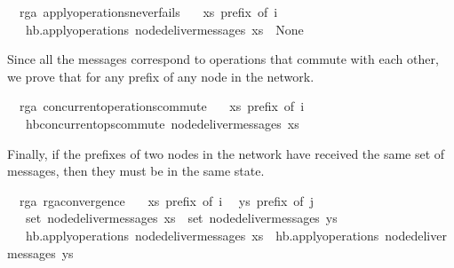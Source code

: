 \documentclass[acmlarge,review,anonymous]{acmart}\settopmatter{printfolios=true}
\begin{document}
\begin{isabellebody}
\isanewline
{}\isamarkupfalse%
\ {\isacharparenleft}\ rga{\isacharparenright}\ apply{\isacharunderscore}operations{\isacharunderscore}never{\isacharunderscore}fails{\isacharcolon}\isanewline
\ \ \ {\isachardoublequoteopen}xs\ prefix\ of\ i{\isachardoublequoteclose}\isanewline
\ \ \ {\isachardoublequoteopen}hb.apply{\isacharunderscore}operations\ {\isacharparenleft}node{\isacharunderscore}deliver{\isacharunderscore}messages\ xs{\isacharparenright}\ {\isasymnoteq}\ None{\isachardoublequoteclose}\isanewline
\end{isabellebody}

Since all the messages correspond to operations that commute with each other, we prove that  for any prefix of any node in the network.

\begin{isabellebody}
\isanewline
{}\isamarkupfalse%
\ {\isacharparenleft}\ rga{\isacharparenright}\ concurrent{\isacharunderscore}operations{\isacharunderscore}commute{\isacharcolon}\isanewline
\ \ \ {\isachardoublequoteopen}xs\ prefix\ of\ i{\isachardoublequoteclose}\isanewline
\ \ \ {\isachardoublequoteopen}hb{\isachardot}concurrent{\isacharunderscore}ops{\isacharunderscore}commute\ {\isacharparenleft}node{\isacharunderscore}deliver{\isacharunderscore}messages\ xs{\isacharparenright}{\isachardoublequoteclose}\isanewline
\end{isabellebody}

Finally, if the prefixes of two nodes in the network have received the same set
of messages, then they must be in the same state.

\begin{isabellebody}
\isanewline
{}\isamarkupfalse%
\ {\isacharparenleft}\ rga{\isacharparenright}\ rga{\isacharunderscore}convergence{\isacharcolon}\isanewline
\ \ \ {\isachardoublequoteopen}xs\ prefix\ of\ i{\isachardoublequoteclose}
\ \ {\isachardoublequoteopen}ys\ prefix\ of\ j{\isachardoublequoteclose}\isanewline
\ \ \ {\isachardoublequoteopen}set\ {\isacharparenleft}node{\isacharunderscore}deliver{\isacharunderscore}messages\ xs{\isacharparenright}\ {\isacharequal}\ set\ {\isacharparenleft}node{\isacharunderscore}deliver{\isacharunderscore}messages\ ys{\isacharparenright}{\isachardoublequoteclose}\isanewline
\ \ \ {\isachardoublequoteopen}hb.apply{\isacharunderscore}operations\ {\isacharparenleft}node{\isacharunderscore}deliver{\isacharunderscore}messages\ xs{\isacharparenright}\ {\isacharequal}\ hb.apply{\isacharunderscore}operations\ {\isacharparenleft}node{\isacharunderscore}deliver{\isacharunderscore}messages\ ys{\isacharparenright}{\isachardoublequoteclose}\isanewline
\end{isabellebody}
\end{document}
